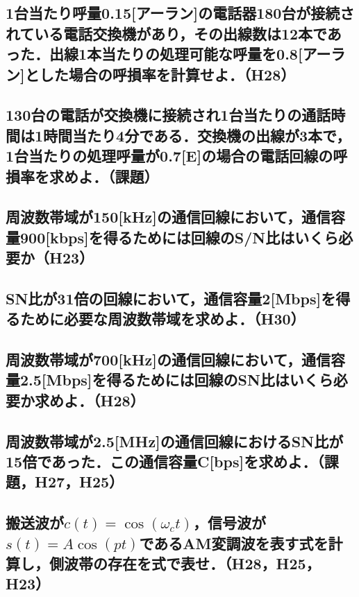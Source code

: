 \subsection{1台当たり呼量0.15[アーラン]の電話器180台が接続されている電話交換機があり，その出線数は12本であった．出線1本当たりの処理可能な呼量を0.8[アーラン]とした場合の呼損率を計算せよ．（H28）}
\vspace{7cm}

\newpage
\subsection{130台の電話が交換機に接続され1台当たりの通話時間は1時間当たり4分である．交換機の出線が3本で，1台当たりの処理呼量が0.7[E]の場合の電話回線の呼損率を求めよ．（課題）}
\vspace{7cm}

\subsection{周波数帯域が150[kHz]の通信回線において，通信容量900[kbps]を得るためには回線のS/N比はいくら必要か（H23）}
\vspace{7cm}

\subsection{SN比が31倍の回線において，通信容量2[Mbps]を得るために必要な周波数帯域を求めよ．（H30）}
\vspace{7cm}

\newpage
\subsection{周波数帯域が700[kHz]の通信回線において，通信容量2.5[Mbps]を得るためには回線のSN比はいくら必要か求めよ．（H28）}
\vspace{7cm}

\subsection{周波数帯域が2.5[MHz]の通信回線におけるSN比が15倍であった．この通信容量C[bps]を求めよ．（課題，H27，H25）}
\vspace{7cm}

\subsection{搬送波が$c(t) = \cos(\omega_c t)$，信号波が$s(t) = A \cos(pt)$であるAM変調波を表す式を計算し，側波帯の存在を式で表せ．（H28，H25，H23）}
\vspace{7cm}

